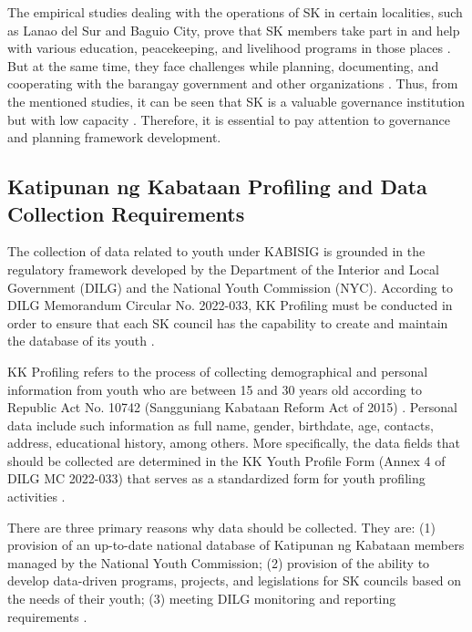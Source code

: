 \hspace*{\parindent}The empirical studies dealing with the operations of SK in certain localities, such as Lanao del Sur and Baguio City, prove that SK members take part in and help with various education, peacekeeping, and livelihood programs in those places \cite{AC,AN}. But at the same time, they face challenges while planning, documenting, and cooperating with the barangay government and other organizations \cite{AC,AN}. Thus, from the mentioned studies, it can be seen that SK is a valuable governance institution but with low capacity \cite{I,J,K}. Therefore, it is essential to pay attention to governance and planning framework development.
\vspace{5mm}

\subsection{Katipunan ng Kabataan Profiling and Data Collection Requirements}

\hspace*{\parindent}The collection of data related to youth under KABISIG is grounded in the regulatory framework developed by the Department of the Interior and Local Government (DILG) and the National Youth Commission (NYC). According to DILG Memorandum Circular No. 2022-033, KK Profiling must be conducted in order to ensure that each SK council has the capability to create and maintain the database of its youth \cite{L}.
\vspace{5mm}

\hspace*{\parindent}KK Profiling refers to the process of collecting demographical and personal information from youth who are between 15 and 30 years old according to Republic Act No. 10742 (Sangguniang Kabataan Reform Act of 2015) \cite{AU}. Personal data include such information as full name, gender, birthdate, age, contacts, address, educational history, among others. More specifically, the data fields that should be collected are determined in the KK Youth Profile Form (Annex 4 of DILG MC 2022-033) that serves as a standardized form for youth profiling activities \cite{L}.
\vspace{5mm}

\hspace*{\parindent}There are three primary reasons why data should be collected. They are: (1) provision of an up-to-date national database of Katipunan ng Kabataan members managed by the National Youth Commission; (2) provision of the ability to develop data-driven programs, projects, and legislations for SK councils based on the needs of their youth; (3) meeting DILG monitoring and reporting requirements \cite{L,AU}.
\vspace{5mm}

